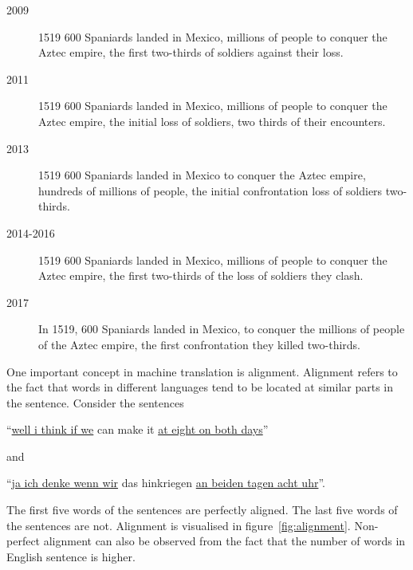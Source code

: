 \begin{description}
    \item[2009] 1519 600 Spaniards landed in Mexico, millions of people to conquer the Aztec empire, the first two-thirds of soldiers against their loss.
    \item[2011] 1519 600 Spaniards landed in Mexico, millions of people to conquer the Aztec empire, the initial loss of soldiers, two thirds of their encounters.
    \item[2013] 1519 600 Spaniards landed in Mexico to conquer the Aztec empire, hundreds of millions of people, the initial confrontation loss of soldiers two-thirds.
    \item[2014-2016] 1519 600 Spaniards landed in Mexico, millions of people to conquer the Aztec empire, the first two-thirds of the loss of soldiers they clash.
    \item[2017] In 1519, 600 Spaniards landed in Mexico, to conquer the millions of people of the Aztec empire, the first confrontation they killed two-thirds.
\end{description}

One important concept in machine translation is alignment.
Alignment refers to the fact that words in different languages tend to be located at similar parts in the sentence.
Consider the sentences

\begin{center}
    ``\underline{well i think if we} can make it \underline{at eight on both days}''
\end{center}
and
\begin{center}
    ``\underline{ja ich denke wenn wir} das hinkriegen \underline{an beiden tagen acht uhr}''.
\end{center}
\vspace*{1mm}
The first five words of the sentences are perfectly aligned.
The last five words of the sentences are not.
Alignment is visualised in figure~\ref{fig:alignment}.
Non-perfect alignment can also be observed from the fact that the number of words in English sentence is higher.

